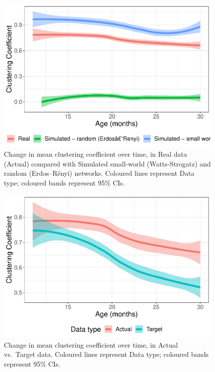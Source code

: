 \documentclass[
  man,floatsintext]{apa6}
\begin{document}
\begin{figure}
\centering
\includegraphics{NetworkGraphs_supplementary-data_files/figure-latex/Figure-clust-coef-age-1.pdf}
\caption{\label{fig:Figure-clust-coef-age}Change in mean clustering coefficient over time, in Real data (Actual) compared with Simulated small-world (Watts-Strogatz) and random (Erdos--Rényi) networks. Coloured lines represent Data type; coloured bands represent 95\% CIs.}
\end{figure}

\begin{figure}
\centering
\includegraphics{NetworkGraphs_supplementary-data_files/figure-latex/Figure-clust-coef-DT-age-1.pdf}
\caption{\label{fig:Figure-clust-coef-DT-age}Change in mean clustering coefficient over time, in Actual vs.~Target data. Coloured lines represent Data type; coloured bands represent 95\% CIs.}
\end{figure}


\clearpage
\renewcommand{\listfigurename}{Figure captions}
\end{document}
